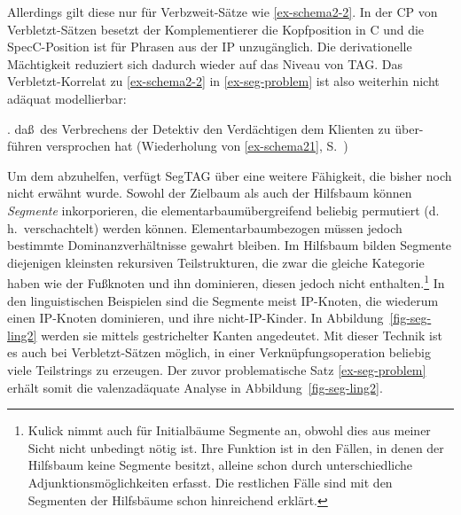 \noindent Allerdings gilt diese  nur für Verbzweit-Sätze wie \ref{ex-schema2-2}. In der CP von Verbletzt-Sätzen besetzt der Komplementierer die Kopfposition in C und die SpecC-Position ist für Phrasen aus der IP unzugänglich. Die derivationelle Mächtigkeit reduziert sich dadurch wieder auf das Niveau von TAG. Das Verbletzt-Korrelat zu \ref{ex-schema2-2} in \ref{ex-seg-problem}  ist also weiterhin nicht adäquat modellierbar: 

\ex. da\ss \ des Verbrechens der Detektiv den Verdächtigen dem Klienten zu über-\linebreak führen versprochen hat\label{ex-seg-problem} \hfill (Wiederholung von \ref{ex-schema21}, S.~\pageref{ex-schema21})

Um dem abzuhelfen, verfügt SegTAG über eine weitere Fähigkeit, die bisher noch nicht erwähnt wurde. Sowohl der Zielbaum als auch der Hilfsbaum können {\it Segmente} inkorporieren, die elementarbaumübergreifend beliebig permutiert (d.\,h.\ verschachtelt) werden können. Elementarbaumbezogen müssen jedoch bestimmte Dominanzverhältnisse gewahrt bleiben. Im Hilfsbaum bilden Segmente diejenigen kleinsten rekursiven Teilstrukturen, die zwar die gleiche Kategorie haben wie der Fu\ss knoten und ihn dominieren, diesen jedoch nicht enthalten.\footnote{Kulick nimmt auch für Initialbäume Segmente an, obwohl dies aus meiner Sicht nicht unbedingt nötig ist. Ihre Funktion ist in den Fällen, in denen der Hilfsbaum keine Segmente besitzt, alleine schon durch unterschiedliche Adjunktionsmöglichkeiten erfasst. Die restlichen Fälle sind mit den Segmenten der Hilfsbäume schon hinreichend erklärt.} In den linguistischen Beispielen sind die Segmente meist IP-Knoten, die wiederum einen IP-Knoten dominieren, und ihre nicht-IP-Kinder. In Abbildung~\ref{fig-seg-ling2} werden sie mittels gestrichelter Kanten angedeutet. Mit dieser Technik ist es auch bei Verbletzt-Sätzen möglich, in einer Verknüpfungsoperation beliebig viele Teilstrings zu erzeugen. Der zuvor problematische Satz \ref{ex-seg-problem} erhält somit die valenzadäquate Analyse in Abbildung~\ref{fig-seg-ling2}.      

